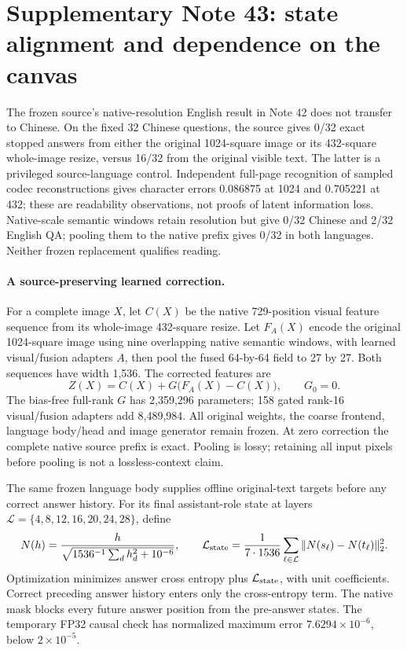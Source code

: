 \clearpage
\section*{Supplementary Note 43: state alignment and dependence on the canvas}
The frozen source's native-resolution English result in Note 42 does not
transfer to Chinese. On the fixed 32 Chinese questions, the source gives
0/32 exact stopped answers from either the original 1024-square image or its
432-square whole-image resize, versus 16/32 from the original visible text.
The latter is a privileged source-language control. Independent full-page
recognition of sampled codec reconstructions gives character errors 0.086875
at 1024 and 0.705221 at 432; these are readability observations, not proofs
of latent information loss. Native-scale semantic windows retain resolution
but give 0/32 Chinese and 2/32 English QA; pooling them to the native prefix
gives 0/32 in both languages. Neither frozen replacement qualifies reading.

\paragraph{A source-preserving learned correction.}
For a complete image $X$, let $C(X)$ be the native 729-position visual feature
sequence from its whole-image 432-square resize. Let $F_A(X)$ encode the
original 1024-square image using nine overlapping native semantic windows,
with learned visual/fusion adapters $A$, then pool the fused 64-by-64 field
to 27 by 27. Both sequences have width 1,536. The corrected features are
\[
 Z(X)=C(X)+G\bigl(F_A(X)-C(X)\bigr),\qquad G_0=0.
\]
The bias-free full-rank $G$ has 2,359,296 parameters; 158 gated rank-16
visual/fusion adapters add 8,489,984. All original weights, the coarse
frontend, language body/head and image generator remain frozen. At zero
correction the complete native source prefix is exact. Pooling is lossy;
retaining all input pixels before pooling is not a lossless-context claim.

The same frozen language body supplies offline original-text targets before
any correct answer history. For its final assistant-role state at layers
$\mathcal L=\{4,8,12,16,20,24,28\}$, define
\[
 N(h)=\frac{h}{\sqrt{1536^{-1}\sum_d h_d^2+10^{-6}}},\qquad
 \mathcal L_{\rm state}=\frac{1}{7\cdot1536}
 \sum_{\ell\in\mathcal L}\|N(s_\ell)-N(t_\ell)\|_2^2.
\]
Optimization minimizes answer cross entropy plus $\mathcal L_{\rm state}$,
with unit coefficients. Correct preceding answer history enters only the
cross-entropy term. The native mask blocks every future answer position
from the pre-answer states. The temporary FP32 causal check has normalized
maximum error $7.6294\times10^{-6}$, below $2\times10^{-5}$.

